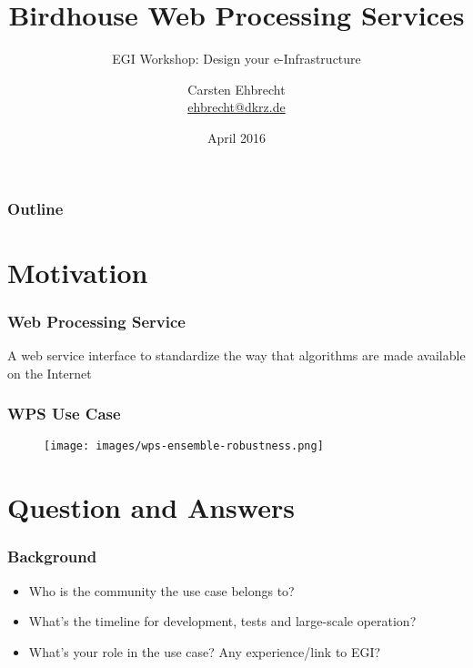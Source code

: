 \documentclass{beamer}
\title{Birdhouse Web Processing Services}
\subtitle{EGI Workshop: Design your e-Infrastructure}
\author{
Carsten Ehbrecht\\
\medskip
{\scriptsize \url{ehbrecht@dkrz.de}}
}
\institute{German Climate Computing Center (DKRZ)}
\date{April 2016}
\begin{document}

  \begin{frame}[plain]
    \titlepage
  \end{frame}


  {
    \begin{frame} %
      \frametitle{Outline}
      \tableofcontents[subsectionstyle=hide/hide]
    \end{frame}
  }


  \section{Motivation}

  \begin{frame}
    \frametitle{Web Processing Service}
    A web service interface to standardize the way that algorithms are made available on the Internet
    \begin{figure}
    \end{figure}
  \end{frame}


  \begin{frame}
    \frametitle{WPS Use Case}
    \begin{figure}
      \texttt{[image: images/wps-ensemble-robustness.png]}
    \end{figure}
  \end{frame}


  \section{Question and Answers}

  \begin{frame}
    \frametitle{Background}
    \begin{itemize}
      \item Who is the community the use case belongs to?
      \item What's the timeline for development, tests and large-scale operation?
      \item What's your role in the use case? Any experience/link to EGI? 
    \end{itemize}
  \end{frame}
\end{document}
